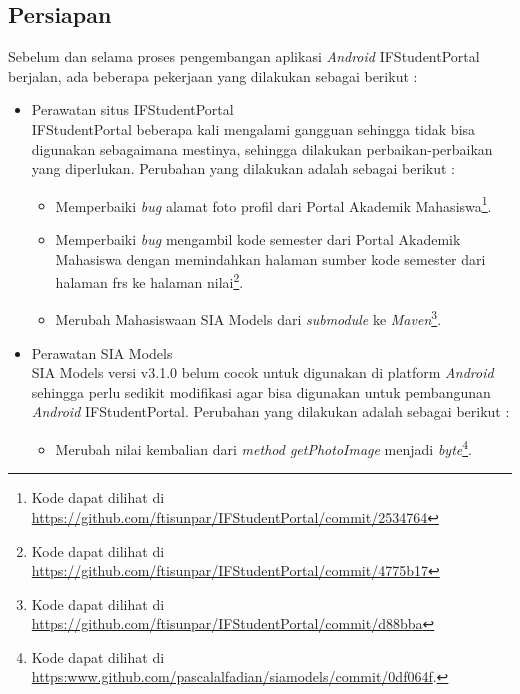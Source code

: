 \subsection{Persiapan}
Sebelum dan selama proses pengembangan aplikasi \textit{Android} IFStudentPortal berjalan, ada beberapa pekerjaan yang dilakukan sebagai berikut :
\begin{itemize}
    \item Perawatan situs IFStudentPortal\\
    IFStudentPortal beberapa kali mengalami gangguan sehingga tidak bisa digunakan sebagaimana mestinya, sehingga dilakukan perbaikan-perbaikan yang diperlukan. Perubahan yang dilakukan adalah sebagai berikut :
    \begin{itemize}
        \item Memperbaiki \textit{bug} alamat foto profil dari Portal Akademik Mahasiswa\footnote{Kode dapat dilihat di \url{https://github.com/ftisunpar/IFStudentPortal/commit/2534764}}.
        \item Memperbaiki \textit{bug} mengambil kode semester dari Portal Akademik Mahasiswa dengan memindahkan halaman sumber kode semester dari halaman frs ke halaman nilai\footnote{Kode dapat dilihat di \url{https://github.com/ftisunpar/IFStudentPortal/commit/4775b17}}.
        \item Merubah Mahasiswaan SIA Models dari \textit{submodule} ke \textit{Maven}\footnote{Kode dapat dilihat di \url{https://github.com/ftisunpar/IFStudentPortal/commit/d88bba}}.
    \end{itemize}
    \item Perawatan SIA Models\\
    SIA Models versi v3.1.0 belum cocok untuk digunakan di platform \textit{Android} sehingga perlu sedikit modifikasi agar bisa digunakan untuk pembangunan \textit{Android} IFStudentPortal. Perubahan yang dilakukan adalah sebagai berikut :
    \begin{itemize}
        \item Merubah nilai kembalian dari \textit{method getPhotoImage} menjadi \textit{byte}\footnote{Kode dapat dilihat di \url{https:www.github.com/pascalalfadian/siamodels/commit/0df064f}.}.
    \end{itemize}
\end{itemize}


